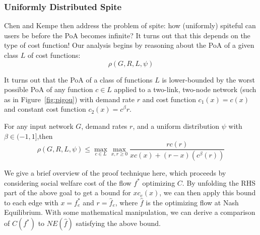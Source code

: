 \subsubsection{Uniformly Distributed Spite}
Chen and Kempe then address the problem of spite: how (uniformly) spiteful can users be before the PoA becomes infinite?
It turns out that this depends on the type of cost function! Our analysis begins by reasoning about the PoA of a given class ${L}$ of cost functions: 
$$\rho(G,R,{L},\psi)$$ 

It turns out that the PoA of a class of functions $L$ is lower-bounded by the worst possible PoA of any function $c\in L$ applied to a two-link, two-node network (such as in Figure~\ref{fig:pigou}) with 
demand rate $r$ and cost function $c_1(x) = c(x)$ and constant cost function $c_2(x) = c^\beta{r}$.
\begin{theorem}
For any input network $G$, demand rates $r$, and a uniform distribution $\psi$ with $\beta \in (-1, 1]$,then 
$$\rho(G,R,{L},\psi) \le \max_{c\in{L}} \max_{x,r\ge 0} \frac{rc(r)}{xc(x) + (r-x)(c^\beta(r))}$$
\end{theorem}
\begin{proof-sketch}
    We give a brief overview of the proof technique here, which proceeds by considering social welfare cost of the flow $f^*$ optimizing $C$. By unfolding the RHS part of the above goal to get a bound for $xc_e(x)$, we can then apply this bound to each edge with $x = f^*_e$ and $r = \hat{f}_e$, where $\hat{f}$ is the optimizing flow at Nash Equilibrium. With some mathematical manipulation, we can derive a comparison of $C(f^*)$ to $NE(\hat{f})$ satisfying the above bound.
\end{proof-sketch}

